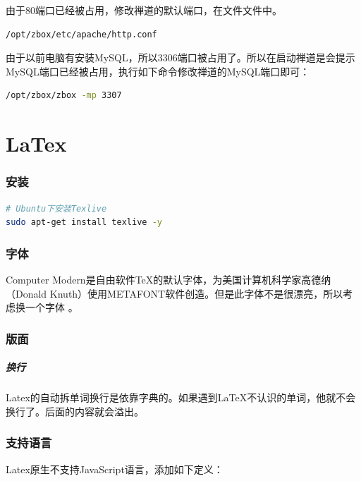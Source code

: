 \documentclass[letter]{book}
\begin{document}
由于80端口已经被占用，修改禅道的默认端口，在文件文件中。

\begin{lstlisting}
/opt/zbox/etc/apache/http.conf
\end{lstlisting}

由于以前电脑有安装MySQL，所以3306端口被占用了。所以在启动禅道是会提示MySQL端口已经被占用，执行如下命令修改禅道的MySQL端口即可：

\begin{lstlisting}[language=Bash]
/opt/zbox/zbox -mp 3307
\end{lstlisting}




\chapter{LaTex}

\subsection{安装}

\begin{lstlisting}[language=Bash]
# Ubuntu下安装Texlive
sudo apt-get install texlive -y
\end{lstlisting}

\subsection{字体}

Computer Modern是自由软件TeX的默认字体，为美国计算机科学家高德纳（Donald Knuth）使用METAFONT软件创造。但是此字体不是很漂亮，所以考虑换一个字体 。

\subsection{版面}

\paragraph{换行}Latex的自动拆单词换行是依靠字典的。如果遇到\LaTeX{}不认识的单词，他就不会换行了。后面的内容就会溢出。

\subsection{支持语言}

Latex原生不支持JavaScript语言，添加如下定义：
\end{document}
